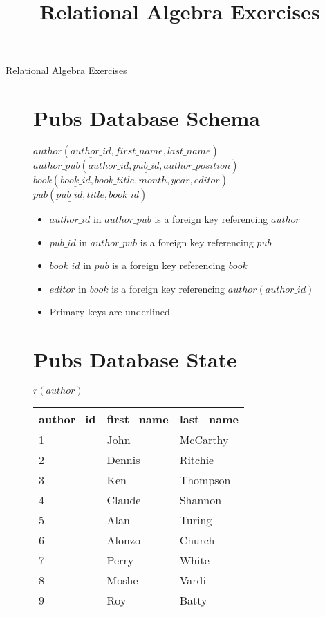 \documentclass{exam}
\title{Relational Algebra Exercises}
\date{}
\begin{document}
\begin{center}
\LARGE{Relational Algebra Exercises}
\end{center}

\begin{figure}[H]

\section*{Pubs Database Schema}

$author(\underline{author\_id}, first\_name, last\_name)$\\

$author\_pub(\underline{author\_id}, \underline{pub\_id}, author\_position)$\\

$book(\underline{book\_id}, book\_title, month, year, editor)$\\

$pub(\underline{pub\_id}, title, book\_id)$

\begin{itemize}
\item $author\_id$ in $author\_pub$ is a foreign key referencing $author$
\item $pub\_id$ in $author\_pub$ is a foreign key referencing $pub$
\item $book\_id$ in $pub$ is a foreign key referencing $book$
\item $editor$ in $book$ is a foreign key referencing $author(author\_id)$
\item Primary keys are underlined
\end{itemize}

\section*{Pubs Database State}

\begin{multicols}{2}

$r(author)$\\
\begin{tabular}{|l|l|l|}\hline
\rowcolor{lightgray} author\_id & first\_name & last\_name \\\hline
1 & John       & McCarthy  \\\hline
2 & Dennis     & Ritchie   \\\hline
3 & Ken        & Thompson  \\\hline
4 & Claude     & Shannon   \\\hline
5 & Alan       & Turing    \\\hline
6 & Alonzo     & Church    \\\hline
7 & Perry      & White     \\\hline
8 & Moshe      & Vardi     \\\hline
9 & Roy        & Batty     \\\hline
\end{tabular}


\end{multicols}
\end{figure}
\end{document}
